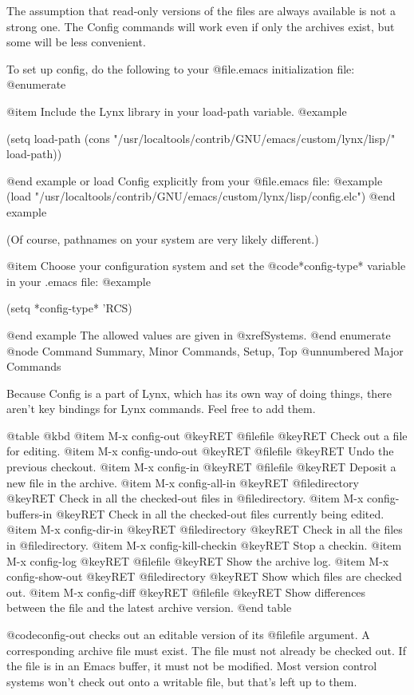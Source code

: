 The assumption that read-only versions of the files are always
available is not a strong one.  The Config commands will work even if
only the archives exist, but some will be less convenient.

To set up config, do the following to your @file{.emacs} initialization file:
@enumerate

@item
Include the Lynx library in your load-path variable.
@example

(setq load-path
      (cons "/usr/localtools/contrib/GNU/emacs/custom/lynx/lisp/"
	    load-path))

@end example
or load Config explicitly from your @file{.emacs} file:
@example
   (load "/usr/localtools/contrib/GNU/emacs/custom/lynx/lisp/config.elc")
@end example

(Of course, pathnames on your system are very likely different.)

@item
Choose your configuration system and set the @code{*config-type*}
variable in your .emacs file:
@example

	(setq *config-type* 'RCS)

@end example
The allowed values are given in @xref{Systems}.
@end enumerate
@node Command Summary, Minor Commands, Setup, Top
@unnumbered Major Commands

Because Config is a part of Lynx, which has its own way of doing
things, there aren't key bindings for Lynx commands.  Feel free to add
them.  

@table @kbd
@item M-x config-out @key{RET} @file{file} @key{RET}
Check out a file for editing.
@item M-x config-undo-out @key{RET} @file{file} @key{RET}
Undo the previous checkout.
@item M-x config-in @key{RET} @file{file} @key{RET}
Deposit a new file in the archive.
@item M-x config-all-in @key{RET} @file{directory} @key{RET}
Check in all the checked-out files in @file{directory}.
@item M-x config-buffers-in @key{RET}
Check in all the checked-out files currently being edited.
@item M-x config-dir-in @key{RET} @file{directory} @key{RET}
Check in all the files in @file{directory}.
@item M-x config-kill-checkin @key{RET}
Stop a checkin.
@item M-x config-log @key{RET} @file{file} @key{RET}
Show the archive log.
@item M-x config-show-out @key{RET} @file{directory} @key{RET}
Show which files are checked out.
@item M-x config-diff @key{RET} @file{file} @key{RET}
Show differences between the file and the latest archive version.
@end table

@code{config-out} checks out an editable version of its @file{file}
argument.  A corresponding archive file must exist.  The file must not
already be checked out.  If the file is in an Emacs buffer, it must
not be modified.  Most version control systems won't check out onto a
writable file, but that's left up to them.

